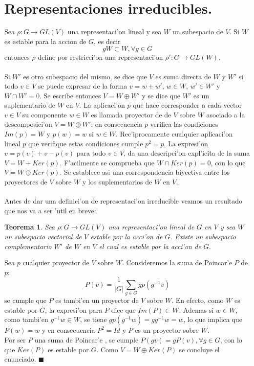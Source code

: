 \documentclass[a4paper,openright,12pt]{book}
\numberwithin{equation}{section} %
\newtheorem{teorema}{Teorema}[section] %
\newenvironment{proof}{\noindent{\it Demostracion:}}{\hfill$\blacksquare$} %
\begin{document}
\section{Representaciones irreducibles.}
Sea $\rho : G \rightarrow GL(V)$ una representaci'on lineal y sea $W$ un subespacio de $V$. Si $W$ es estable para la accion de $G$, es decir
\[
gW \subset W, \forall g \in G
\]
entonces $\rho$ define por restricci'on una representaci'on $\rho':G \rightarrow GL(W)$.\\
\\
Si $W'$ es otro subespacio del mismo, se dice que $V$ es suma directa de $W$ y $W'$ si todo $v \in V$ se puede expresar de la forma $v=w+w'$, $w \in W$, $w' \in W'$ y $W \cap W'=0$. Se escribe entonces $V=W \oplus W'$ y se dice que $W'$ es un suplementario de $W$ en $V$. La aplicaci'on $p$ que hace corresponder a cada vector $v \in V$ su componente $w \in W$ es llamada proyector de de $V$ sobre $W$ asociado a la descomposici'on $V=W \oplus W'$; en consecuencia $p$ verifica las condiciones $Im(p)=W$ y $p(w)=w$ si $w \in W$. Rec'iprocamente cualquier aplicaci'on lineal $p$ que verifique estas condiciones cumple $p^{2}=p$. La expresi'on $v=p(v)+v-p(v)$ para todo $v \in V$, da una descripci'on expl'icita de la suma $V=W + Ker(p)$. F'acilmente se comprueba que $W \cap Ker(p)=0$, con lo que $V=W \oplus Ker(p)$. Se establece asi una correspondencia biyectiva entre los proyectores de $V$ sobre $W$ y los suplementarios de $W$ en $V$.\\
\\  
Antes de dar una definici'on de representaci'on irreducible veamos un resultado que nos va a ser 'util en breve:
\begin{teorema}
Sea $\rho: G \rightarrow GL(V)$ una representaci'on lineal de $G$ en $V$ y sea $W$ un subespacio vectorial de $V$ estable por la acci'on de $G$. Existe un subespacio complementario $W'$ de $W$ en $V$ el cual es estable por la acci'on de $G$.
\end{teorema}
\begin{proof}
Sea $p$ cualquier proyector de $V$ sobre $W$. Consideremos la suma de Poincar'e $P$ de $p$:
\[
P(v)=\frac{1}{|G|}\sum_{g \in G}gp(g^{-1}v)
\]
se cumple que $P$ es tambi'en un proyector de $V$ sobre $W$. En efecto, como $W$ es estable por $G$, la expresi'on para $P$ dice que $Im(P)\subset W$. Ademas si $w \in W$, como tambi'en $g^{-1}w \in W$, se tiene $gp(g^{-1}w)=gg^{-1}w=w$, lo que implica que $P(w)=w$ y en consecuencia $P^{2}=Id$ y $P$ es un proyector sobre $W$.\\
Por ser $P$ una suma de Poincar'e , se cumple $P(gv)=gP(v), \forall g \in G$, con lo que $Ker(P)$ es estable por $G$. Como $V=W \oplus Ker(P)$ se concluye el enunciado.
\end{proof}\\
\end{document}
